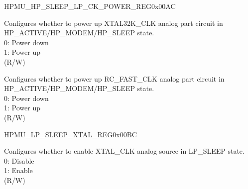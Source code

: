 \begin{register}{H}{PMU\_HP\_SLEEP\_LP\_CK\_POWER\_REG}{0x00AC}\label{regdesc:PMUHPSLEEPLPCKPOWERREG}
%
%
%
%
%
\regnewline%
\begin{regdesc}\begin{reglist}
\label{fielddesc:PMUHPSLEEPXPDXTAL32K}\item [PMU\_HP\_SLEEP\_XPD\_XTAL32K] Configures whether to power up XTAL32K\_CLK analog part circuit in HP\_ACTIVE/HP\_MODEM/HP\_SLEEP state.\\
0: Power down\\
1: Power up\\
(R/W)
\label{fielddesc:PMUHPSLEEPXPDFOSCCLK}\item [PMU\_HP\_SLEEP\_XPD\_FOSC\_CLK] Configures whether to power up RC\_FAST\_CLK analog part circuit in HP\_ACTIVE/HP\_MODEM/HP\_SLEEP state.\\
0: Power down\\
1: Power up\\
(R/W)
\end{reglist}\end{regdesc}
\end{register}


\begin{register}{H}{PMU\_LP\_SLEEP\_XTAL\_REG}{0x00BC}\label{regdesc:PMULPSLEEPXTALREG}
%
%
\regnewline%
\begin{regdesc}\begin{reglist}
\label{fielddesc:PMULPSLEEPXPDXTAL}\item [PMU\_LP\_SLEEP\_XPD\_XTAL] Configures whether to enable XTAL\_CLK analog source in LP\_SLEEP state.\\
0: Disable\\
1: Enable\\
(R/W)
\end{reglist}\end{regdesc}
\end{register}


